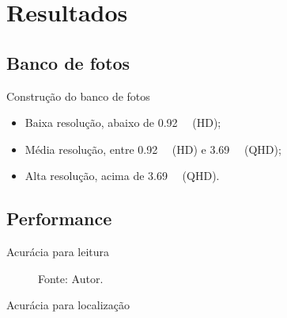 \section{Resultados}

\subsection{Banco de fotos}
\begin{frame}{Construção do banco de fotos}
	\begin{table}
		\centering
		\caption*{Informações sobre o banco de fotos criado, contando quantidade de imagens, se estão presente ou auxentes no Bulário Eletrônico da Anvisa e resolução.}
		\caption*{Fonte: Autor.}
	\end{table}
	\begin{itemize}\footnotesize
		\item Baixa resolução, abaixo de \SI{0.92}{\mega\pixel} (HD);
		\item Média resolução, entre \SI{0.92}{\mega\pixel} (HD) e \SI{3.69}{\mega\pixel} (QHD);
		\item Alta resolução, acima de \SI{3.69}{\mega\pixel} (QHD).
	\end{itemize}
\end{frame}


\subsection{Performance}
\begin{frame}{Acurácia para leitura}
	\begin{table}
		\centering
		\caption*{Acurácia geral do sistema, destaque para casos lidos parcial ou corretamente.}
		\caption*{Fonte: Autor.}
	\end{table}
\end{frame}

\begin{frame}
	\begin{figure}
		\centering
		\caption*{Gráfico de acurácia geral do sistema, com \num{1216} itens.}
		
		\caption*{Fonte: Autor.}
	\end{figure}
\end{frame}

\begin{frame}{Acurácia para localização}
	\begin{table}
		\centering
		\caption*{Acurácia do sistema somente para casos lidos corretamente, destaque para casas localizados corretamente ou semelhantes.}
		\caption*{Fonte: Autor.}
	\end{table}
\end{frame}

